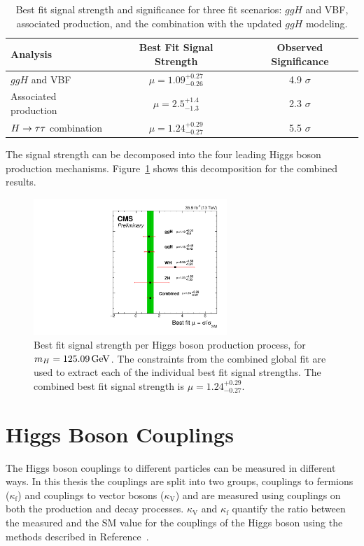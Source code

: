 \begin{table}[htbp]
\renewcommand{\arraystretch}{1.3}
\centering
\begin{tabular}{lcc}
Analysis         &   Best Fit Signal Strength    &   Observed Significance    \\
\hline
$ggH$ and VBF             &   $\mu = 1.09 ^{+0.27} _{-0.26}$   &  4.9 $\sigma$     \\
Associated production     &   $\mu = 2.5  ^{+1.4}  _{-1.3}$    &  2.3 $\sigma$     \\
$H\to\tau\tau$ combination        &   $\mu = 1.24 ^{+0.29} _{-0.27}$   &  5.5 $\sigma$     \\
\hline
\end{tabular}
\caption{
Best fit signal strength and significance for three fit scenarios: $ggH$ and VBF,
associated production, and the combination with the updated $ggH$ modeling.
}
\label{tab:cmb_mu_and_sig}
\end{table}


The signal strength can be decomposed into the four leading Higgs boson production 
mechanisms. Figure~\ref{fig:cmb_mu_higgs_processes} shows this decomposition for
the combined results. 

\begin{figure}[!ht]
 \begin{center}
  \includegraphics[width=0.65\textwidth]{higgs_to_taus_vh/plots/combined/mu_higgs_procs.pdf}
 \end{center}
 \caption{
 Best fit signal strength per Higgs boson production process, for $m_{H} = 125.09\,\mathrm{GeV}$.
 The constraints from the combined global fit are used to extract each of the 
 individual best fit signal strengths. The combined best fit signal strength 
 is $\mu = 1.24 ^{+0.29} _{-0.27}$.
 }
 \label{fig:cmb_mu_higgs_processes}
\end{figure}



\section{Higgs Boson Couplings}
The Higgs boson couplings to different particles can be measured in different
ways. In this thesis the couplings are split into two groups, couplings to
fermions ($\kappa_\text{f}$) and couplings to vector bosons ($\kappa_\text{V}$) 
and are measured using couplings on both the production and decay processes. 
$\kappa_\text{V}$ and $\kappa_\text{f}$ quantify
the ratio between the measured and the SM value for the couplings of the Higgs boson
using the methods described in Reference~\cite{Khachatryan:2016vau}.

